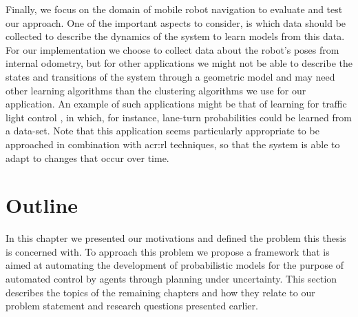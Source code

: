 Finally, we focus on the domain of mobile robot navigation to evaluate and test our approach.
One of the important aspects to consider, is which data should be collected to describe the dynamics of the system to learn models from this data.
For our implementation we choose to collect data about the robot's poses from internal odometry, but for other applications we might not be able to describe the states and transitions of the system through a geometric model and may need other learning algorithms than the clustering algorithms we use for our application.
An example of such applications might be that of learning  for traffic light control \cite{wiering2004intelligent, delgado2011efficient}, in which, for instance, lane-turn probabilities could be learned from a data-set.
Note that this application seems particularly appropriate to be approached in combination with \acrshort{acr:rl} techniques, so that the system is able to adapt to changes that occur over time.


\section{Outline}
\label{sec:introduction-outline}

In this chapter we presented our motivations and defined the problem this thesis is concerned with.
To approach this problem we propose a framework that is aimed at automating the development of probabilistic models for the purpose of automated control by agents through planning under uncertainty.
This section describes the topics of the remaining chapters and how they relate to our problem statement and research questions presented earlier. %

